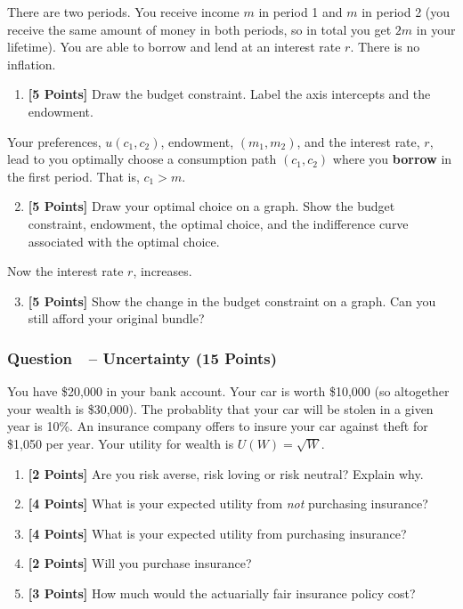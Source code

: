 \documentclass[10pt]{article}
\newcounter{question}[section]
\newcommand{\question}[1]{\refstepcounter{question}
  \subsubsection*{Question~\thequestion~-- #1}}
\newenvironment{subquestions}{
  \begin{enumerate}[label=(\roman*)]}{\end{enumerate}}
\begin{document}
\medskip\noindent
There are two periods. You receive income $m$ in period 1 and $m$ in period 2 (you receive the same amount of money in both periods, so in total you get $2m$ in your lifetime). You are able to borrow and lend at an interest rate $r$. There is no inflation.
\begin{subquestions}
  \item \textbf{[5 Points]} Draw the budget constraint. Label the axis
    intercepts and the endowment.
\end{subquestions}
Your preferences, $u\left( c_1,c_2 \right)$, endowment, $\left( m_1,m_2 \right)$, and the interest rate, $r$, lead to you optimally choose a consumption path $\left( c_1,c_2 \right)$ where you \textbf{borrow} in the first period. That is, $c_1>m$.
\begin{subquestions}
  \setcounter{enumi}{1}
  \item \textbf{[5 Points]} Draw your optimal choice on a graph. Show the
    budget constraint, endowment, the optimal choice, and the indifference
    curve associated with the optimal choice.
\end{subquestions}
Now the interest rate $r$, increases.
\begin{subquestions}
  \setcounter{enumi}{2}
\item \textbf{[5 Points]} Show the change in the budget constraint on a graph. Can you still afford your original bundle?
\end{subquestions}

\question{Uncertainty (15 Points)}
You have \$20,000 in your bank account. Your car is worth \$10,000 (so
altogether your wealth is \$30,000).  The probablity that your car will be
stolen in a given year is 10\%. An insurance company offers to insure your car
against theft for \$1,050 per year.  Your utility for wealth is $U\left( W
\right)=\sqrt{W}$.
\begin{subquestions}
  \item \textbf{[2 Points]} Are you risk averse, risk loving or risk neutral? Explain why.
  \item \textbf{[4 Points]} What is your expected utility from \emph{not}
      purchasing insurance?
  \item \textbf{[4 Points]} What is your expected utility from purchasing
    insurance?
  \item \textbf{[2 Points]} Will you purchase insurance?
  \item \textbf{[3 Points]} How much would the actuarially fair insurance
    policy cost?
\end{subquestions}
\end{document}
